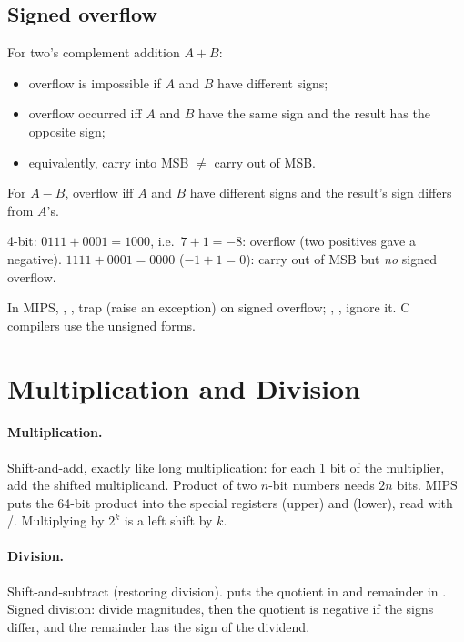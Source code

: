 \subsection{Signed overflow}

\begin{important}
For two's complement addition $A + B$:
\begin{itemize}
  \item overflow is impossible if $A$ and $B$ have different signs;
  \item overflow occurred iff $A$ and $B$ have the same sign and the result
    has the opposite sign;
  \item equivalently, carry into MSB $\ne$ carry out of MSB.
\end{itemize}
For $A - B$, overflow iff $A$ and $B$ have different signs and the result's
sign differs from $A$'s.
\end{important}

\begin{example}
4-bit: $0111 + 0001 = 1000$, i.e.\ $7 + 1 = -8$: overflow (two positives gave
a negative). $1111 + 0001 = 0000$ ($-1 + 1 = 0$): carry out of MSB but
\emph{no} signed overflow.
\end{example}

In MIPS, , ,  trap (raise an exception) on
signed overflow; , ,  ignore it. C compilers
use the unsigned forms.

\section{Multiplication and Division}

\paragraph{Multiplication.} Shift-and-add, exactly like long multiplication:
for each 1 bit of the multiplier, add the shifted multiplicand. Product of
two $n$-bit numbers needs $2n$ bits. MIPS  puts the
64-bit product into the special registers  (upper) and 
(lower), read with /. Multiplying by $2^k$ is a left
shift by $k$.

\paragraph{Division.} Shift-and-subtract (restoring division).  puts the quotient in  and remainder in .
Signed division: divide magnitudes, then the quotient is negative if the
signs differ, and the remainder has the sign of the dividend.

